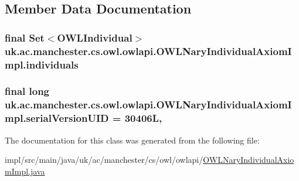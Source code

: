 \subsection{Member Data Documentation}
\hypertarget{classuk_1_1ac_1_1manchester_1_1cs_1_1owl_1_1owlapi_1_1_o_w_l_nary_individual_axiom_impl_aa2ee45265a7a0c1f5cc9260ac97ac071}{
\subsubsection[{individuals}]{\setlength{\rightskip}{0pt plus 5cm}final Set$<${\bf O\-W\-L\-Individual}$>$ uk.\-ac.\-manchester.\-cs.\-owl.\-owlapi.\-O\-W\-L\-Nary\-Individual\-Axiom\-Impl.\-individuals\hspace{0.3cm}{\ttfamily [private]}}}\label{classuk_1_1ac_1_1manchester_1_1cs_1_1owl_1_1owlapi_1_1_o_w_l_nary_individual_axiom_impl_aa2ee45265a7a0c1f5cc9260ac97ac071}
\hypertarget{classuk_1_1ac_1_1manchester_1_1cs_1_1owl_1_1owlapi_1_1_o_w_l_nary_individual_axiom_impl_a5b752ea401100ff906a3f178b45be9c2}{
\subsubsection[{serial\-Version\-U\-I\-D}]{\setlength{\rightskip}{0pt plus 5cm}final long uk.\-ac.\-manchester.\-cs.\-owl.\-owlapi.\-O\-W\-L\-Nary\-Individual\-Axiom\-Impl.\-serial\-Version\-U\-I\-D = 30406\-L\hspace{0.3cm}{\ttfamily [static]}, {\ttfamily [private]}}}\label{classuk_1_1ac_1_1manchester_1_1cs_1_1owl_1_1owlapi_1_1_o_w_l_nary_individual_axiom_impl_a5b752ea401100ff906a3f178b45be9c2}


The documentation for this class was generated from the following file\-:\begin{DoxyCompactItemize}
\item 
impl/src/main/java/uk/ac/manchester/cs/owl/owlapi/\hyperlink{_o_w_l_nary_individual_axiom_impl_8java}{O\-W\-L\-Nary\-Individual\-Axiom\-Impl.\-java}\end{DoxyCompactItemize}
